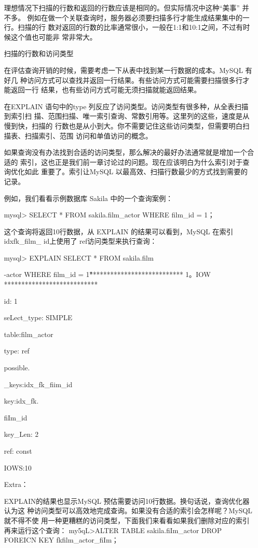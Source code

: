 理想情况下扫描的行数和返回的行数应该是相同的。但实际情况中这种“美事” 并不多。
例如在做一个关联查询时，服务器必须要扫描多行才能生成结果集中的一行。扫描的行
数对返回的行数的比率通常很小，一般在1:1和10:1之间，不过有时候这个值也可能非
常非常大。

扫描的行数和访问类型

在评估查询开销的时候，需要考虑一下从表中找到某一行数据的成本。MySQL 有好几
种访问方式可以查找并返回一行结果。有些访问方式可能需要扫描很多行才能返回一行
结果，也有些访问方式可能无须扫描就能返回结果。

在EXPLAIN 语句中的type 列反应了访问类型。访问类型有很多种，从全表扫描到索引扫
描、范围扫描、唯一索引查询、常数引用等。这里列的这些，速度是从慢到快，扫描的
行数也是从小到大。你不需要记住这些访问类型，但需要明白扫描表、扫描索引、范围
访问和单值访问的概念。

如果查询没有办法找到合适的访问类型，那么解决的最好办法通常就是增加一个合适的
索引，这也正是我们前一章讨论过的问题。现在应该明白为什么索引对于查询优化如此
重要了。索引让MySQL 以最高效、扫描行数最少的方式找到需要的记录。

例如，我们看看示例数据库 Sakila 中的一个查询案例：

mysql> SELECT * FROM sakila.film\_actor WHERE film\_id = 1；

这个查询将返回10行数据，从 EXPLAIN 的结果可以看到，MySQL 在索引 idxfk\_film\_
id上使用了 ref访问类型来执行查询：

mysql> EXPLAIN SELECT * FROM sakila.film

-actor WHERE film\_id = 1\G

*************************** 1。IOW ***************************

id: 1

seLect\_type: SIMPLE

table:film\_actor

type: ref

possible.

\_keys:idx\_fk\_fiim\_id

key:idx\_fk.

fiIm\_id

key\_Len: 2

ref: const

IOWS:10

Extra：

EXPLAIN的结果也显示MySQL 预估需要访问10行数据。换句话说，查询优化器认为这
种访问类型可以高效地完成查询。如果没有合适的索引会怎样呢？MySQL 就不得不使
用一种更糟糕的访问类型，下面我们来看看如果我们删除对应的索引再来运行这个查询：
my5qL>ALTER TABLE sakila.fiIm\_actor DROP FOREICN KEY fkfilm\_actor\_fiIm；

